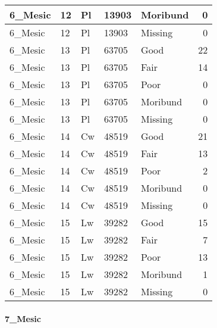 \documentclass[
]{article}
\begin{document}
\begin{tabular}{l|l|l|l|l|r}
\hline
6\_Mesic & 12 & Pl & 13903 & Moribund & 0\\
\hline
6\_Mesic & 12 & Pl & 13903 & Missing & 0\\
\hline
6\_Mesic & 13 & Pl & 63705 & Good & 22\\
\hline
6\_Mesic & 13 & Pl & 63705 & Fair & 14\\
\hline
6\_Mesic & 13 & Pl & 63705 & Poor & 0\\
\hline
6\_Mesic & 13 & Pl & 63705 & Moribund & 0\\
\hline
6\_Mesic & 13 & Pl & 63705 & Missing & 0\\
\hline
6\_Mesic & 14 & Cw & 48519 & Good & 21\\
\hline
6\_Mesic & 14 & Cw & 48519 & Fair & 13\\
\hline
6\_Mesic & 14 & Cw & 48519 & Poor & 2\\
\hline
6\_Mesic & 14 & Cw & 48519 & Moribund & 0\\
\hline
6\_Mesic & 14 & Cw & 48519 & Missing & 0\\
\hline
6\_Mesic & 15 & Lw & 39282 & Good & 15\\
\hline
6\_Mesic & 15 & Lw & 39282 & Fair & 7\\
\hline
6\_Mesic & 15 & Lw & 39282 & Poor & 13\\
\hline
6\_Mesic & 15 & Lw & 39282 & Moribund & 1\\
\hline
6\_Mesic & 15 & Lw & 39282 & Missing & 0\\
\hline
\end{tabular}

\hypertarget{mesic-10}{%
\paragraph{7\_Mesic}\label{mesic-10}}
\end{document}
